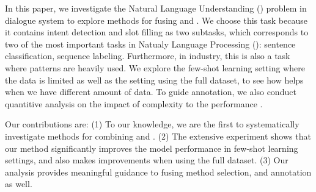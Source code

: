 In this paper, we investigate the Natural Language Understanding (\NLU) problem in dialogue system to explore methods for fusing \RE and \NN. We choose this task because it contains intent detection and slot filling as two subtasks, which corresponds to two of the most important tasks in Natualy Language Processing (\NLP): sentence classification, sequence labeling. 
Furthermore, in industry, this is also a task where \RE patterns are heavily used.
We explore the few-shot learning setting where the data is limited as well as the setting using the full dataset, to see how \RE helps when we have different amount of data. To guide \RE annotation, we also conduct quantitive analysis on the impact of \RE complexity to the performance \NN. 

Our contributions are: (1) To our knowledge, we are the first to systematically investigate methods for combining \RE and \NN. (2) The extensive experiment shows that our method significantly improves the model performance in few-shot learning settings, and also makes improvements when using the full dataset. (3) Our analysis provides meaningful guidance to fusing method selection, and \RE annotation as well.


